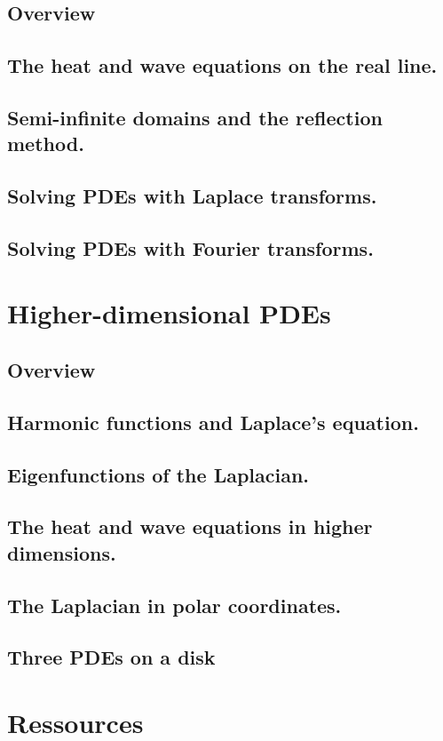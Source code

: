 \documentclass{article}
\begin{document}
\subsection*{Overview}
\subsection{The heat and wave equations on the real line.}
\subsection{Semi-infinite domains and the reflection method.}
\subsection{Solving PDEs with Laplace transforms.}
\subsection{Solving PDEs with Fourier transforms.}
\pagebreak
\section{Higher-dimensional PDEs}
\subsection*{Overview}
\subsection{Harmonic functions and Laplace's equation.}
\subsection{Eigenfunctions of the Laplacian.}
\subsection{The heat and wave equations in higher dimensions.}
\subsection{The Laplacian in polar coordinates.}
\subsection{Three PDEs on a disk}

\pagebreak

\section{Ressources}%
\label{sec:Ressources}
\end{document}

